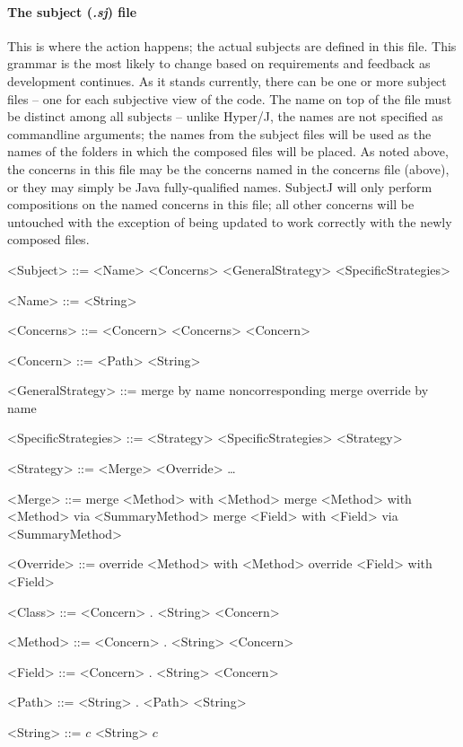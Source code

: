 \documentclass[11pt,letterpaper]{article}
\begin{document}
    \paragraph{The subject (\emph{.sj}) file}
    This is where the action happens; the actual subjects are defined in this file. This grammar is the most likely to change based on requirements and feedback as development continues. As it stands currently, there can be one or more subject files -- one for each subjective view of the code. The name on top of the file must be distinct among all subjects -- unlike Hyper/J, the names are not specified as commandline arguments; the names from the subject files will be used as the names of the folders in which the composed files will be placed. As noted above, the concerns in this file may be the concerns named in the concerns file (above), or they may simply be Java fully-qualified names. SubjectJ will only perform compositions on the named concerns in this file; all other concerns will be untouched with the exception of being updated to work correctly with the newly composed files.
    \begin{grammar}
        <Subject> ::= <Name> <Concerns> <GeneralStrategy> <SpecificStrategies>

        <Name> ::= <String>

        <Concerns> ::= <Concern> <Concerns>
        \alt <Concern>

        <Concern> ::= <Path>
        \alt <String>

        <GeneralStrategy> ::= merge by name
        \alt noncorresponding merge
        \alt override by name

        <SpecificStrategies> ::= <Strategy> <SpecificStrategies>
        \alt <Strategy>

        <Strategy> ::= <Merge>
        \alt <Override>
        \alt \ldots

        <Merge> ::= merge <Method> with <Method>
        \alt merge <Method> with <Method> via <SummaryMethod>
        \alt merge <Field> with <Field> via <SummaryMethod>

        <Override> ::= override <Method> with <Method>
        \alt override <Field> with <Field>

        <Class> ::= <Concern> . <String>
        \alt <Concern>

        <Method> ::= <Concern> . <String>
        \alt <Concern>

        <Field> ::= <Concern> . <String>
        \alt <Concern>

        <Path> ::= <String> . <Path>
        \alt <String>

        <String> ::= $c$ <String>
        \alt $c$
    \end{grammar}
\end{document}
